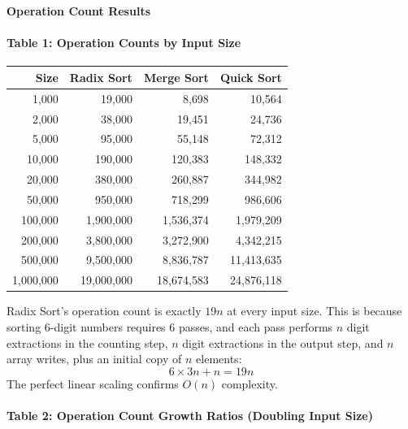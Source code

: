 \documentclass[12pt]{article}
\begin{document}
\newpage
\noindent\textbf{Operation Count Results}

\paragraph{Table 1: Operation Counts by Input Size}

\begin{table}[h]
\centering
\begin{tabular}{@{}rrrr@{}}
\toprule
\textbf{Size} & \textbf{Radix Sort} & \textbf{Merge Sort} & \textbf{Quick Sort} \\
\midrule
1{,}000     & 19{,}000      & 8{,}698      & 10{,}564 \\
2{,}000     & 38{,}000      & 19{,}451     & 24{,}736 \\
5{,}000     & 95{,}000      & 55{,}148     & 72{,}312 \\
10{,}000    & 190{,}000     & 120{,}383    & 148{,}332 \\
20{,}000    & 380{,}000     & 260{,}887    & 344{,}982 \\
50{,}000    & 950{,}000     & 718{,}299    & 986{,}606 \\
100{,}000   & 1{,}900{,}000 & 1{,}536{,}374 & 1{,}979{,}209 \\
200{,}000   & 3{,}800{,}000 & 3{,}272{,}900 & 4{,}342{,}215 \\
500{,}000   & 9{,}500{,}000 & 8{,}836{,}787 & 11{,}413{,}635 \\
1{,}000{,}000 & 19{,}000{,}000 & 18{,}674{,}583 & 24{,}876{,}118 \\
\bottomrule
\end{tabular}
\end{table}

Radix Sort's operation count is exactly $19n$ at every input size. This is because sorting 6-digit numbers requires 6 passes, and each pass performs $n$ digit extractions in the counting step, $n$ digit extractions in the output step, and $n$ array writes, plus an initial copy of $n$ elements:
\[
6 \times 3n + n = 19n
\]
The perfect linear scaling confirms $O(n)$ complexity.

\paragraph{Table 2: Operation Count Growth Ratios (Doubling Input Size)}
\end{document}
